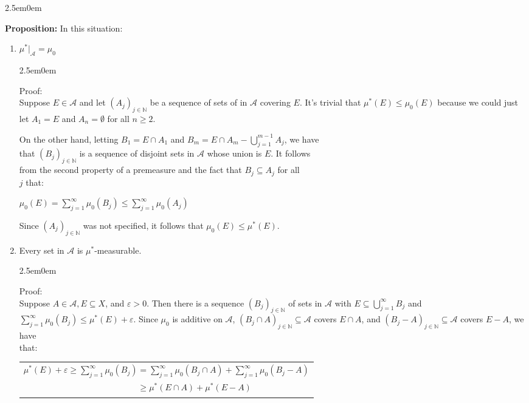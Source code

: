 \documentclass{book}
\newcommand{\hTwo}{%
\color{MidnightBlue}%
   \fontsize{13}{15}\selectfont%
}
\newcommand{\hThree}{%
   \color{PineGreen!85!Orange}
   \fontsize{12}{14}\selectfont%
}
\newenvironment{myIndent}{%
   \begin{adjustwidth}{2.5em}{0em}%
}{%
   \end{adjustwidth}%
}
\newcommand{\blab}[1]{\textbf{#1}}
\newcommand{\retTwo}{\hfill\bigbreak}
\begin{document}
\begin{myIndent}\hTwo
   \blab{Proposition:} In this situation:
   \begin{enumerate}
      \item $\mu^*|_\mathcal{A} = \mu_0$
      \begin{myIndent}\hThree
         Proof:\\
         Suppose $E \in \mathcal{A}$ and let $(A_j)_{j \in \mathbb{N}}$ be a sequence of sets of in $\mathcal{A}$ covering $E$. It's trivial that $\mu^*(E) \leq \mu_0(E)$ because we could just let $A_1 = E$ and $A_n = \emptyset$ for all $n \geq 2$.\newpage
         
         On the other hand, letting $B_1 = E \cap A_1$ and $B_m = E \cap A_m - \bigcup\limits_{j = 1}^{m-1}A_j$, we have\\ that $(B_j)_{j \in \mathbb{N}}$ is a sequence of disjoint sets in $\mathcal{A}$ whose union is $E$. It follows\\ [5pt] from the second property of a premeasure and the fact that $B_j \subseteq A_j$ for all\\ [5pt] $j$ that:
         
         {\centering$\mu_0(E) = \sum\limits_{j=1}^\infty \mu_0(B_j) \leq \sum\limits_{j=1}^\infty \mu_0(A_j)$\retTwo\par}
         
         Since $(A_j)_{j \in \mathbb{N}}$ was not specified, it follows that $\mu_0(E) \leq \mu^*(E)$.\retTwo
      \end{myIndent}

      \item Every set in $\mathcal{A}$ is $\mu^*$-measurable.
      \begin{myIndent}\hThree
         Proof:\\
         Suppose $A \in \mathcal{A}, E \subseteq X$, and $\varepsilon > 0$. Then there is a sequence $(B_j)_{j \in \mathbb{N}}$ of sets in $\mathcal{A}$ with $E \subseteq \bigcup\limits_{j=1}^\infty B_j$ and $\sum\limits_{j=1}^\infty \mu_0(B_j) \leq \mu^*(E) + \varepsilon$. Since $\mu_0$ is additive on $\mathcal{A}$, $(B_j \cap A)_{j \in \mathbb{N}} \subseteq \mathcal{A}$ covers $E \cap A$, and $(B_j - A)_{j \in \mathbb{N}} \subseteq \mathcal{A}$ covers $E - A$, we have\\ [5pt] that:

         {\centering 
         \begin{tabular}{l}
            $\mu^*(E) + \varepsilon \geq \sum\limits_{j = 1}^\infty \mu_0(B_j) = \sum\limits_{j = 1}^\infty \mu_0(B_j \cap A) + \sum\limits_{j = 1}^\infty \mu_0(B_j - A)$\\
            $\phantom{\mu^*(E) + \varepsilon \geq \sum\limits_{j = 1}^\infty \mu_0(B_j)} \geq \mu^*(E \cap A) + \mu^*(E - A) $
         \end{tabular} \retTwo\par}


\end{myIndent}
\end{enumerate}
\end{myIndent}
\end{document}
